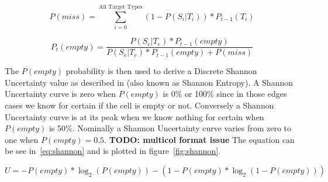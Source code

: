 \begin{multicols*}{2}
\begin{equation}
\label{eq:bayesianEmptyDenom}
P(miss) = \sum_{i=0}^{\text{All Target Types}} (1 - P(S_{i}|T_{i})) * P_{t-1}(T_{i})
\end{equation}

\begin{equation}
\label{eq:bayesianEmpty}
P_{t}(empty) = \frac{P(S_{e}|T_{e})*P_{t-1}(empty)}{ P(S_{e}|T_{e})*P_{t-1}(empty) + P(miss)}
\end{equation}

The $P(empty)$ probability is then used to derive a Discrete Shannon Uncertainty value as described in \cite{shannon} (also known as Shannon Entropy).  A Shannon Uncertainty curve is zero when $P(empty)$ is 0\% or 100\% since in those edges cases we know for certain if the cell is empty or not.  Conversely a Shannon Uncertainty curve is at its peak when we know nothing for certain when $P(empty)$ is 50\%.  Nominally a Shannon Uncertainty curve varies from zero to one when $P(empty) = 0.5$. \textbf{TODO: multicol format issue}  The equation can be see in~\ref{eq:shannon} and is plotted in figure~\ref{fig:shannon}.

\end{multicols*}

\begin{equation}
\label{eq:shannon}
U = -P(empty) * \log_{2}(P(empty)) - ( 1-P(empty) * \log_{2}(1-P(empty)))
\end{equation}

